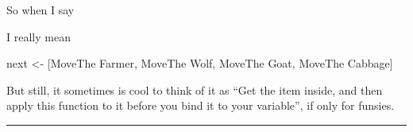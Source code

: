 \documentclass[]{article}
\newenvironment{Shaded}{}{}
\newcommand{\DataTypeTok}[1]{\textcolor[rgb]{0.56,0.13,0.00}{{#1}}}
\newcommand{\DecValTok}[1]{\textcolor[rgb]{0.25,0.63,0.44}{{#1}}}
\newcommand{\OtherTok}[1]{\textcolor[rgb]{0.00,0.44,0.13}{{#1}}}
\newcommand{\FunctionTok}[1]{\textcolor[rgb]{0.02,0.16,0.49}{{#1}}}
\newcommand{\NormalTok}[1]{{#1}}
\begin{document}
\begin{Shaded}
\end{Shaded}

So when I say

\begin{Shaded}
\end{Shaded}

I really mean

\begin{Shaded}
\begin{Highlighting}[]
\NormalTok{next }\OtherTok{<-} \NormalTok{[}\DataTypeTok{MoveThe} \DataTypeTok{Farmer}\NormalTok{, }\DataTypeTok{MoveThe} \DataTypeTok{Wolf}\NormalTok{, }\DataTypeTok{MoveThe} \DataTypeTok{Goat}\NormalTok{, }\DataTypeTok{MoveThe} \DataTypeTok{Cabbage}\NormalTok{]}
\end{Highlighting}
\end{Shaded}

But still, it sometimes is cool to think of it as ``Get the item inside, and
then apply this function to it before you bind it to your variable'', if only
for funsies.

\begin{center}\rule{0.5\linewidth}{\linethickness}\end{center}
\end{document}
